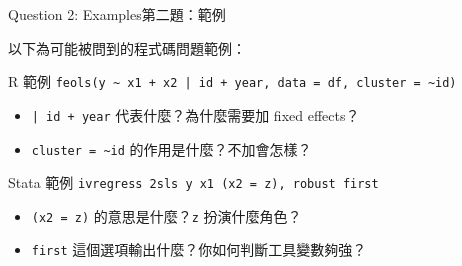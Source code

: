 \documentclass[dvipsnames,hyperref={pdfpagelabels=false}]{beamer}
\begin{document}
\begin{frame}{Question 2: Examples}{第二題：範例}

\vspace{0.1cm}
\small
以下為可能被問到的程式碼問題範例：

\vspace{0.25cm}
\begin{block}{R 範例}
\texttt{feols(y \textasciitilde{} x1 + x2 | id + year, data = df, cluster = \textasciitilde{}id)}
\begin{itemize}
	\item \texttt{| id + year} 代表什麼？為什麼需要加 fixed effects？
	\item \texttt{cluster = \textasciitilde{}id} 的作用是什麼？不加會怎樣？
\end{itemize}
\end{block}

\vspace{0.2cm}
\begin{block}{Stata 範例}
\texttt{ivregress 2sls y x1 (x2 = z), robust first}
\begin{itemize}
	\item \texttt{(x2 = z)} 的意思是什麼？\texttt{z} 扮演什麼角色？
	\item \texttt{first} 這個選項輸出什麼？你如何判斷工具變數夠強？
\end{itemize}
\end{block}

\end{frame}
\end{document}

